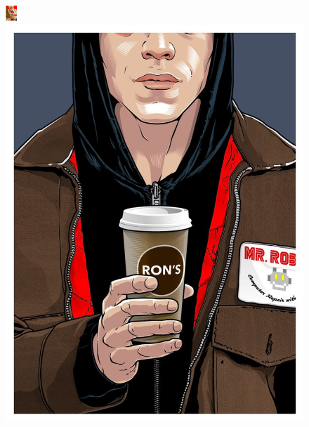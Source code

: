 \documentclass[14pt, a4paper]{article}  %
\author{Голованова Лиза}
\begin{document}
\begin{figure}[!htb]
  \includegraphics[width=0.8\linewidth]{pop3.pdf}
\endminipage\hfill
{}
  \includegraphics[width=0.8\linewidth]{pop5.pdf}

\end{figure}
\end{document}
